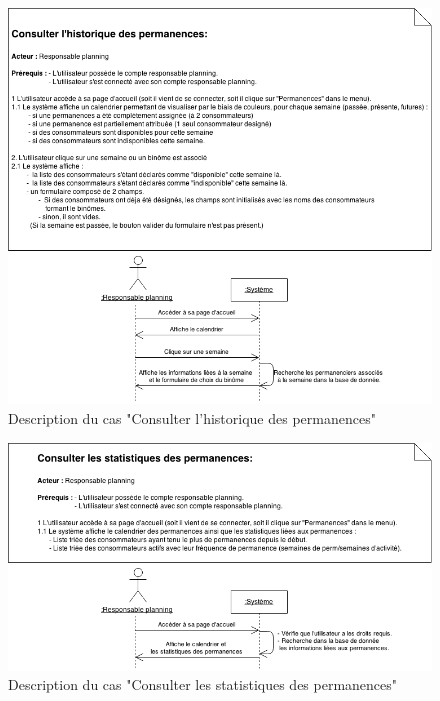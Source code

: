 \documentclass[12pt]{report}
\begin{document}
\begin{figure}[!H]
\centering
\includegraphics[width=1.\textwidth]{./ressources/desc_UC_voir_permanences.png}
\caption{Description du cas "Consulter l'historique des permanences"}
\end{figure}
\clearpage

\begin{figure}[!H]
\centering
\includegraphics[width=1.\textwidth]{./ressources/desc_UC_stats_permanences.png}
\caption{Description du cas "Consulter les statistiques des permanences"}
\end{figure}
\clearpage
\end{document}
